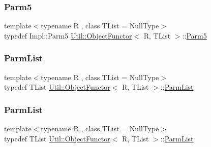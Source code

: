 \mbox{\label{classUtil_1_1ObjectFunctor_a8428e04dd3fb91bc7f7c518a1771eecb}} 
\subsubsection{\texorpdfstring{Parm5}{Parm5}\hspace{0.1cm}{\footnotesize\ttfamily [2/2]}}
{\footnotesize\ttfamily template$<$typename R , class T\+List  = Null\+Type$>$ \\
typedef Impl\+::\+Parm5 \mbox{\hyperlink{classUtil_1_1ObjectFunctor}{Util\+::\+Object\+Functor}}$<$ R, T\+List $>$\+::\mbox{\hyperlink{classUtil_1_1ObjectFunctor_a8428e04dd3fb91bc7f7c518a1771eecb}{Parm5}}}

\mbox{\label{classUtil_1_1ObjectFunctor_ae0ad0a2f4b9f3a67014d4fc237df3c99}} 
\subsubsection{\texorpdfstring{ParmList}{ParmList}\hspace{0.1cm}{\footnotesize\ttfamily [1/2]}}
{\footnotesize\ttfamily template$<$typename R , class T\+List  = Null\+Type$>$ \\
typedef T\+List \mbox{\hyperlink{classUtil_1_1ObjectFunctor}{Util\+::\+Object\+Functor}}$<$ R, T\+List $>$\+::\mbox{\hyperlink{classUtil_1_1ObjectFunctor_ae0ad0a2f4b9f3a67014d4fc237df3c99}{Parm\+List}}}

\mbox{\label{classUtil_1_1ObjectFunctor_ae0ad0a2f4b9f3a67014d4fc237df3c99}} 
\subsubsection{\texorpdfstring{ParmList}{ParmList}\hspace{0.1cm}{\footnotesize\ttfamily [2/2]}}
{\footnotesize\ttfamily template$<$typename R , class T\+List  = Null\+Type$>$ \\
typedef T\+List \mbox{\hyperlink{classUtil_1_1ObjectFunctor}{Util\+::\+Object\+Functor}}$<$ R, T\+List $>$\+::\mbox{\hyperlink{classUtil_1_1ObjectFunctor_ae0ad0a2f4b9f3a67014d4fc237df3c99}{Parm\+List}}}


